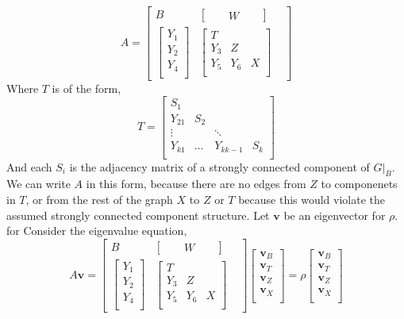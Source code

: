\documentclass{paper}
\begin{document}
\[
A =
\begin{bmatrix}
B &  \begin{bmatrix}
& & W & &
\end{bmatrix}& \\
\begin{bmatrix}
Y_1 \\
Y_2 \\
Y_4 \\
\end{bmatrix} &
\begin{bmatrix}
 T \\
 Y_3 & Z \\
 Y_5 & Y_6 & X \\
\end{bmatrix}
\end{bmatrix} 
\]
Where $T$ is of the form,
\[
T
= 
\begin{bmatrix}
S_1 \\
Y_{21} & S_2 \\
\vdots & & \ddots \\
Y_{k1} & \hdots & Y_{kk-1} & S_k \\
\end{bmatrix}
\]
And each $S_i$ is the adjacency matrix of a strongly connected component of $G|_{\overline{B}}$. We can write $A$ in this form, because there are no edges from $Z$ to componenets in $T$, or from the rest of the graph $X$ to $Z$ or $T$ because this would violate the assumed strongly connected component structure. Let $\mathbf{v}$ be an eigenvector for $\rho$. for Consider the eigenvalue equation,
\[
A \mathbf{v}=
\begin{bmatrix}
B &  \begin{bmatrix}
& & W & &
\end{bmatrix}& \\
\begin{bmatrix}
Y_1 \\
Y_2 \\
Y_4 \\
\end{bmatrix} &
\begin{bmatrix}
 T \\
 Y_3 & Z \\
 Y_5 & Y_6 & X \\
\end{bmatrix}
\end{bmatrix} 
 \begin{bmatrix}
\mathbf{v}_B  \\
\mathbf{v}_{T} \\
\mathbf{v}_{Z} \\
\mathbf{v}_{X} \\
\end{bmatrix}
=
\rho
\begin{bmatrix}
\mathbf{v}_B  \\
\mathbf{v}_{T} \\
\mathbf{v}_{Z} \\
\mathbf{v}_{X} \\
\end{bmatrix}
\]
\end{document}

